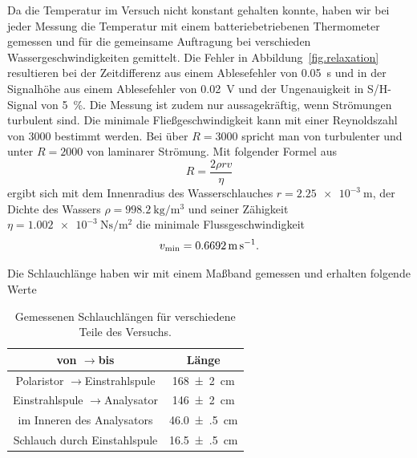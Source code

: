 \documentclass[paper=a4,
	fontsize=10pt,
	DIV=18,
	twocolumn,
	parskip=half
	]{scrartcl}
\numberwithin{equation}{section}    %
\newcommand{\tra}{$\rightarrow $}
\begin{document}
Da die Temperatur im Versuch nicht konstant gehalten konnte, haben wir bei jeder Messung die Temperatur mit einem batteriebetriebenen Thermometer gemessen und für die gemeinsame Auftragung bei verschieden Wassergeschwindigkeiten gemittelt. Die Fehler in Abbildung~\ref{fig.relaxation} resultieren bei der Zeitdifferenz aus einem Ablesefehler von \SI{0.05}{\second} und in der Signalhöhe aus einem Ablesefehler von \SI{0.02}{\volt} und der Ungenauigkeit in S/H-Signal von \SI{5}{\percent}.
Die Messung ist zudem nur aussagekräftig, wenn Strömungen turbulent sind. Die minimale Fließgeschwindigkeit kann mit einer Reynoldszahl von 3000 bestimmt werden. Bei über $R = 3000$ spricht man von turbulenter und unter $R=2000$ von laminarer Strömung. Mit folgender Formel aus~\citet{anleitung}
\begin{equation}
	R=\frac{2\rho rv}{\eta}
\end{equation}
ergibt sich mit dem Innenradius des Wasserschlauches $r=\SI{2.25e-3}{\meter}$, der Dichte des Wassers $\rho=\SI[per-mode=symbol]{998.2}{\kilogram\per\meter^3}$ und seiner Zähigkeit $\eta = \SI[per-mode=symbol]{1.002e-3}{\newton\second\per\meter\squared}$ die minimale Flussgeschwindigkeit
\begin{equation}
	v_{\rm min} = \SI{0.6692}{\meter\per\second}.
	\label{eq.vmin}
\end{equation}

Die Schlauchlänge haben wir mit einem Maßband gemessen und erhalten folgende Werte

\begin{table}[htp]
	\begin{center}
	\begin{tabular}{cc}
		\hline
		von \tra bis & Länge \\
		\hline
		Polaristor \tra Einstrahlspule & \SI{168(2)}{\centi\meter}\\
		Einstrahlspule \tra Analysator & \SI{146(2)}{\centi\meter}\\
		im Inneren des Analysators & \SI{46.0(5)}{\centi\meter}\\
		Schlauch durch Einstahlspule & \SI{16.5(5)}{\centi\meter}\\
		\hline
	\end{tabular}
	\caption{Gemessenen Schlauchlängen für verschiedene Teile des Versuchs.}
	\label{tab.schlauch}
	\end{center}
\end{table}
\end{document}

